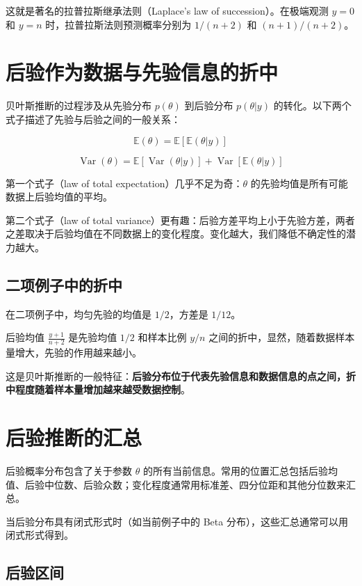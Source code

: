 这就是著名的拉普拉斯继承法则（Laplace's law of succession）。在极端观测 $y=0$ 和 $y=n$ 时，拉普拉斯法则预测概率分别为 $1/(n+2)$ 和 $(n+1)/(n+2)$。

\section{后验作为数据与先验信息的折中}

贝叶斯推断的过程涉及从先验分布 $p(\theta)$ 到后验分布 $p(\theta|y)$ 的转化。以下两个式子描述了先验与后验之间的一般关系：

\[
\mathbb{E}(\theta) = \mathbb{E}\left[\mathbb{E}(\theta|y)\right]
\]

\[
\operatorname{Var}(\theta) = \mathbb{E}\left[\operatorname{Var}(\theta|y)\right] + \operatorname{Var}\left[\mathbb{E}(\theta|y)\right]
\]

第一个式子（law of total expectation）几乎不足为奇：$\theta$ 的先验均值是所有可能数据上后验均值的平均。

第二个式子（law of total variance）更有趣：后验方差平均上小于先验方差，两者之差取决于后验均值在不同数据上的变化程度。变化越大，我们降低不确定性的潜力越大。

\subsection{二项例子中的折中}

在二项例子中，均匀先验的均值是 $1/2$，方差是 $1/12$。

后验均值 $\frac{y+1}{n+2}$ 是先验均值 $1/2$ 和样本比例 $y/n$ 之间的折中，显然，随着数据样本量增大，先验的作用越来越小。

这是贝叶斯推断的一般特征：\textbf{后验分布位于代表先验信息和数据信息的点之间，折中程度随着样本量增加越来越受数据控制}。

\section{后验推断的汇总}

后验概率分布包含了关于参数 $\theta$ 的所有当前信息。常用的位置汇总包括后验均值、后验中位数、后验众数；变化程度通常用标准差、四分位距和其他分位数来汇总。

当后验分布具有闭式形式时（如当前例子中的 Beta 分布），这些汇总通常可以用闭式形式得到。

\subsection{后验区间}

